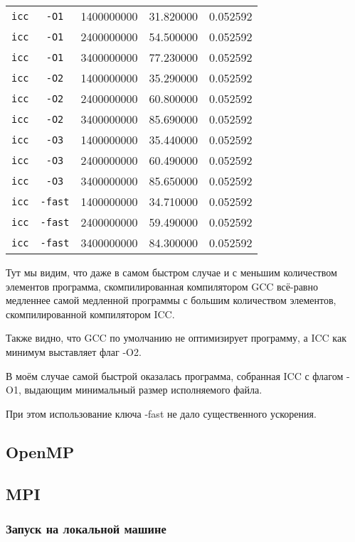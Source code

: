 \documentclass[a4paper,12pt]{article}
\begin{document}
\begin{tabular}{c | c | c c c}
\hline
\texttt{icc} & \texttt{-O1} & 1400000000 & 31.820000 & 0.052592\\
\texttt{icc} & \texttt{-O1} & 2400000000 & 54.500000 & 0.052592\\
\texttt{icc} & \texttt{-O1} & 3400000000 & 77.230000 & 0.052592\\
\hline
\texttt{icc} & \texttt{-O2} & 1400000000 & 35.290000 & 0.052592\\
\texttt{icc} & \texttt{-O2} & 2400000000 & 60.800000 & 0.052592\\
\texttt{icc} & \texttt{-O2} & 3400000000 & 85.690000 & 0.052592\\
\hline
\texttt{icc} & \texttt{-O3} & 1400000000 & 35.440000 & 0.052592\\
\texttt{icc} & \texttt{-O3} & 2400000000 & 60.490000 & 0.052592\\
\texttt{icc} & \texttt{-O3} & 3400000000 & 85.650000 & 0.052592\\
\hline
\texttt{icc} & \texttt{-fast} & 1400000000 & 34.710000 & 0.052592\\
\texttt{icc} & \texttt{-fast} & 2400000000 & 59.490000 & 0.052592\\
\texttt{icc} & \texttt{-fast} & 3400000000 & 84.300000 & 0.052592\\
\hline
\end{tabular}

Тут мы видим, что даже в самом быстром случае и с меньшим количеством элементов программа, скомпилированная компилятором GCC всё-равно медленнее самой медленной программы с большим количеством элементов, скомпилированной компилятором ICC.

Также видно, что GCC по умолчанию не оптимизирует программу, а ICC как минимум выставляет флаг -O2.

В моём случае самой быстрой оказалась программа, собранная ICC с флагом -O1, выдающим минимальный размер исполняемого файла.

При этом использование ключа -fast не дало существенного ускорения.
\newpage
\subsection{OpenMP}

\newpage
\subsection{MPI}
\subsubsection{Запуск на локальной машине}
\end{document}
